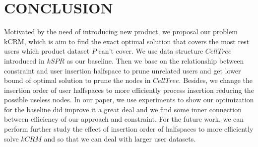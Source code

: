 \chapter*{CONCLUSION}
\label{chap:conclusion}
Motivated by the need of introducing new product, we proposal our problem kCRM, 
which is aim to find the exact optimal solution that covers the most rest users which
product dataset $P$ can't cover. We use data structure $CellTree$ introduced in 
$kSPR$ as our baseline. Then we base on the relationship between constraint and user 
insertion
halfspace to prune unrelated users and get lower bound of optimal solution to prune
the nodes in $CellTree$. Besides, we change the insertion order of user halfspaces 
to more efficiently process insertion reducing the possible useless nodes.
In our paper, we use experiments to show our optimization for the baseline did improve it
a great deal and we find some inner connection between efficiency of our approach 
and constraint. For the future work, we can perform further study the effect of insertion
order of halfspaces to more efficiently solve $kCRM$ and so that we can deal with larger
user datasets.     